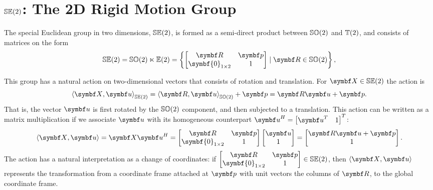 
\chapter{\texorpdfstring{${\mathbb{SE}(2)}$}{SE(2)}: The 2D Rigid Motion Group}

The special Euclidean group in two dimensions, ${\mathbb{SE}(2)}$, is formed as a semi-direct product between ${\mathbb{SO}(2)}$ and ${\mathbb{T}(2)}$, and consists of matrices on the form
\begin{equation}
  \label{eq:se2_matrix}
  \SEtwo = \SOtwo \ltimes \Etwo = \left\{ \begin{bmatrix}
    \bR & \bp \\ \symbf{0}_{1 \times 2} & 1
  \end{bmatrix} \mid \bR \in \SOtwo \right\},
\end{equation}

This group has a natural action on two-dimensional vectors that consists of rotation and translation. For $\X \in \SEtwo$ the action is
\begin{equation}
  \left \langle \X, \bu \right \rangle_{\SEtwo} = \left \langle \bR, \bu \right \rangle_{\SOtwo} + \bp = \bR \bu + \bp.
\end{equation}
That is, the vector $\bu$ is first rotated by the ${\mathbb{SO}(2)}$ component, and then subjected to a translation. This action can be written as a matrix multiplication if we associate $\bu$ with its homogeneous counterpart $\bu^H = \begin{bmatrix} \bu^T & 1 \end{bmatrix}^T$:
\begin{equation}
  \left \langle \X, \bu \right \rangle = \X \bu^H = \begin{bmatrix}
    \bR & \bp \\ \symbf{0}_{1 \times 2} & 1
  \end{bmatrix} \begin{bmatrix}
    \symbf u \\ 1
  \end{bmatrix} = \begin{bmatrix}
    \bR \bu + \bp \\ 1
  \end{bmatrix}.
\end{equation}
The action has a natural interpretation as a change of coordinates: if $\begin{bmatrix} \bR & \bp \\ \symbf{0}_{1 \times 2} & 1 \end{bmatrix} \in \SEtwo$, then $\left \langle \X, \bu \right \rangle$ represents the transformation from a coordinate frame attached at $\bp$ with unit vectors the columns of $\bR$, to the global coordinate frame.


